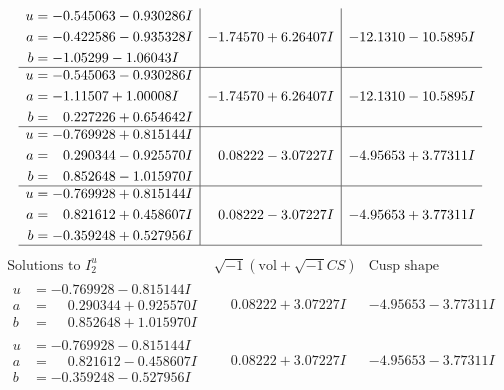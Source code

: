\documentclass[1p]{elsarticle_modified}
\theoremstyle{definition}
\newcommand{\I}{\sqrt{-1}}
\begin{document}
$$\begin{array}{c|c|c}
\begin{aligned}
u &= -0.545063 - 0.930286 I \\
a &= -0.422586 - 0.935328 I \\
b &= -1.05299 - 1.06043 I\end{aligned}
 & -1.74570 + 6.26407 I & -12.1310 - 10.5895 I \\ \hline\begin{aligned}
u &= -0.545063 - 0.930286 I \\
a &= -1.11507 + 1.00008 I \\
b &= \phantom{-}0.227226 + 0.654642 I\end{aligned}
 & -1.74570 + 6.26407 I & -12.1310 - 10.5895 I \\ \hline\begin{aligned}
u &= -0.769928 + 0.815144 I \\
a &= \phantom{-}0.290344 - 0.925570 I \\
b &= \phantom{-}0.852648 - 1.015970 I\end{aligned}
 & \phantom{-}0.08222 - 3.07227 I & -4.95653 + 3.77311 I \\ \hline\begin{aligned}
u &= -0.769928 + 0.815144 I \\
a &= \phantom{-}0.821612 + 0.458607 I \\
b &= -0.359248 + 0.527956 I\end{aligned}
 & \phantom{-}0.08222 - 3.07227 I & -4.95653 + 3.77311 I\\
 \hline 
 \end{array}$$\newpage$$\begin{array}{c|c|c}  
\text{Solutions to }I^u_{2}& \I (\text{vol} + \sqrt{-1}CS) & \text{Cusp shape}\\
 \hline 
\begin{aligned}
u &= -0.769928 - 0.815144 I \\
a &= \phantom{-}0.290344 + 0.925570 I \\
b &= \phantom{-}0.852648 + 1.015970 I\end{aligned}
 & \phantom{-}0.08222 + 3.07227 I & -4.95653 - 3.77311 I \\ \hline\begin{aligned}
u &= -0.769928 - 0.815144 I \\
a &= \phantom{-}0.821612 - 0.458607 I \\
b &= -0.359248 - 0.527956 I\end{aligned}
 & \phantom{-}0.08222 + 3.07227 I & -4.95653 - 3.77311 I \\ \hline\begin{aligned}

\end{aligned}
\end{array}$$
\end{document}
